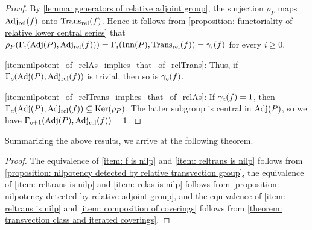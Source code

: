 \begin{proof}
    By \cref{lemma: generators of relative adjoint group}, the surjection $\rho_{P}$ maps $\operatorname{Adj_{rel}}(f)$ onto $\operatorname{Trans_{rel}}(f)$. Hence it follows from \cref{proposition: functoriality of relative lower central series} that $\rho_P(\Gamma_i(\operatorname{Adj}(P),\operatorname{Adj_{rel}}(f))) = \Gamma_i(\operatorname{Inn}(P),\operatorname{Trans_{rel}}(f))=\gamma_{i}(f)$ for every $i\geq 0$.

    \eqref{item:nilpotent_of_relAs_implies_that_of_relTrans}: Thus, if $\Gamma_c(\operatorname{Adj}(P),\operatorname{Adj_{rel}}(f))$ is trivial, then so is $\gamma_{c}(f)$.

    \eqref{item:nilpotent_of_relTrans_implies_that_of_relAs}: If $\gamma_{c}(f)=1$, then $\Gamma_{c}(\operatorname{Adj}(P), \operatorname{Adj_{rel}}(f))\subseteq\operatorname{Ker}(\rho_{P})$. The latter subgroup is central in $\operatorname{Adj}(P)$, so we have $\Gamma_{c+1}(\operatorname{Adj}(P), \operatorname{Adj_{rel}}(f))=1$.
\end{proof}



Summarizing the above results, we arrive at the following theorem.


\begin{proof}
The equivalence of \ref{item: f is nilp} and \ref{item: reltrans is nilp} follows from \cref{proposition: nilpotency detected by relative transvection group},
the equivalence of \ref{item: reltrans is nilp} and \ref{item: relas is nilp} follows from \cref{proposition: nilpotency detected by relative adjoint group}, and
the equivalence of \ref{item: reltrans is nilp} and \ref{item: composition of coverings} follows from \cref{theorem: transvection class and iterated coverings}.
\end{proof}



